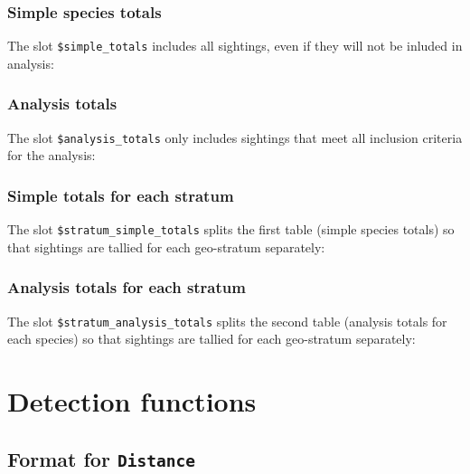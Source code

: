 \documentclass[
]{book}
\begin{document}
\hypertarget{simple-species-totals}{%
\subsection*{Simple species totals}\label{simple-species-totals}}

The slot \texttt{\$simple\_totals} includes all sightings, even if they will not be inluded in analysis:

\hypertarget{analysis-totals}{%
\subsection*{Analysis totals}\label{analysis-totals}}

The slot \texttt{\$analysis\_totals} only includes sightings that meet all inclusion criteria for the analysis:

\hypertarget{simple-totals-for-each-stratum}{%
\subsection*{Simple totals for each stratum}\label{simple-totals-for-each-stratum}}

The slot \texttt{\$stratum\_simple\_totals} splits the first table (simple species totals) so that sightings are tallied for each geo-stratum separately:

\hypertarget{analysis-totals-for-each-stratum}{%
\subsection*{Analysis totals for each stratum}\label{analysis-totals-for-each-stratum}}

The slot \texttt{\$stratum\_analysis\_totals} splits the second table (analysis totals for each species) so that sightings are tallied for each geo-stratum separately:

\hypertarget{df}{%
\chapter{Detection functions}\label{df}}

\hypertarget{format-for-distance}{%
\section*{\texorpdfstring{Format for \texttt{Distance}}{Format for Distance}}\label{format-for-distance}}
\end{document}
